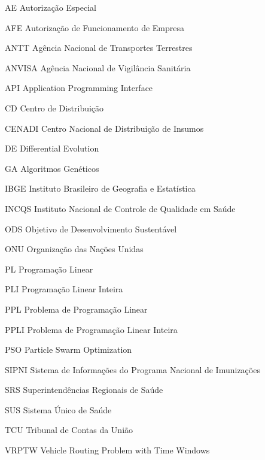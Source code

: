 \begin{siglas}
\item[AE] Autorização Especial
\item[AFE] Autorização de Funcionamento de Empresa
\item[ANTT] Agência Nacional de Transportes Terrestres
\item[ANVISA] Agência Nacional de Vigilância Sanitária
\item[API] Application Programming Interface
\item[CD] Centro de Distribuição
\item[CENADI] Centro Nacional de Distribuição de Insumos
\item[DE] Differential Evolution
\item[GA] Algoritmos Genéticos
\item[IBGE] Instituto Brasileiro de Geografia e Estatística
\item[INCQS] Instituto Nacional de Controle de Qualidade em Saúde
\item[ODS] Objetivo de Desenvolvimento Sustentável
\item[ONU] Organização das Nações Unidas
\item[PL] Programação Linear
\item[PLI] Programação Linear Inteira
\item[PPL] Problema de Programação Linear
\item[PPLI] Problema de Programação Linear Inteira
\item[PSO] Particle Swarm Optimization
\item[SIPNI] Sistema de Informações do Programa Nacional de Imunizações
\item[SRS] Superintendências Regionais de Saúde
\item[SUS] Sistema Único de Saúde
\item[TCU] Tribunal de Contas da União
\item[VRPTW] Vehicle Routing Problem with Time Windows
\end{siglas}